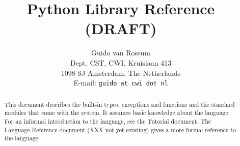 
\usepackage{myformat}


\newcommand{\itembreak}{
	\mbox{}\\*[0mm]
}

\newcommand{\funcitem}[2]{\item[#1(#2)]}

\newcommand{\excitem}[2]{
\item[#1 = {\tt '#2'}]
\itembreak
}

\title{\bf
	Python Library Reference \\
	(DRAFT)
}

\author{
	Guido van Rossum \\
	Dept. CST, CWI, Kruislaan 413 \\
	1098 SJ Amsterdam, The Netherlands \\
	E-mail: {\tt guido at cwi dot nl} %
}




\maketitle

\begin{abstract}

\noindent
This document describes the built-in types, exceptions and functions and
the standard modules that come with the {\Python} system.
It assumes basic knowledge about the {\Python} language.
For an informal introduction to the language, see the Tutorial document.
The Language Reference document (XXX not yet existing)
gives a more formal reference to the language.

\end{abstract}

\pagebreak

\tableofcontents

\pagebreak







